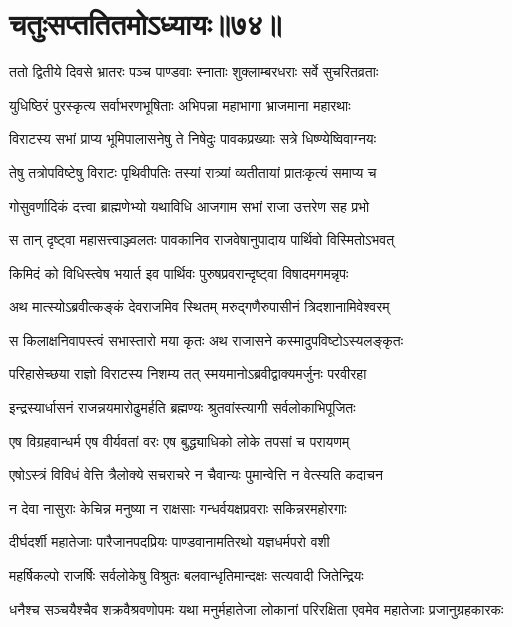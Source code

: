 \chapter{चतुःसप्ततितमोऽध्यायः॥७४॥}
\twolineshloka
{ततो द्वितीये दिवसे भ्रातरः पञ्च पाण्डवाः}
{स्नाताः शुक्लाम्बरधराः सर्वे सुचरितव्रताः}


\twolineshloka
{युधिष्ठिरं पुरस्कृत्य सर्वाभरणभूषिताः}
{अभिपन्ना महाभागा भ्राजमाना महारथाः}


\twolineshloka
{विराटस्य सभां प्राप्य भूमिपालासनेषु ते}
{निषेदुः पावकप्रख्याः सत्रे धिष्ण्येष्विवाग्नयः}


\twolineshloka
{तेषु तत्रोपविष्टेषु विराटः पृथिवीपतिः}
{तस्यां रात्र्यां व्यतीतायां प्रातःकृत्यं समाप्य च}


\twolineshloka
{गोसुवर्णादिकं दत्त्वा ब्राह्मणेभ्यो यथाविधि}
{आजगाम सभां राजा उत्तरेण सह प्रभो}


\twolineshloka
{स तान् दृष्ट्वा महासत्त्वाञ्ज्वलतः पावकानिव}
{राजवेषानुपादाय पार्थिवो विस्मितोऽभवत्}



\twolineshloka
{किमिदं को विधिस्त्वेष भयार्त इव पार्थिवः}
{पुरुषप्रवरान्दृष्ट्वा विषादमगमन्नृपः}


\twolineshloka
{अथ मात्स्योऽब्रवीत्कङ्कं देवराजमिव स्थितम्}
{मरुद्गणैरुपासीनं त्रिदशानामिवेश्वरम्}


\twolineshloka
{स किलाक्षनिवापस्त्वं सभास्तारो मया कृतः}
{अथ राजासने कस्मादुपविष्टोऽस्यलङ्कृतः}



\twolineshloka
{परिहासेच्छया राज्ञो विराटस्य निशम्य तत्}
{स्मयमानोऽब्रवीद्वाक्यमर्जुनः परवीरहा}


\twolineshloka
{इन्द्रस्यार्धासनं राजन्नयमारोढुमर्हति}
{ब्रह्मण्यः श्रुतवांस्त्यागी सर्वलोकाभिपूजितः}


\twolineshloka
{एष विग्रहवान्धर्म एष वीर्यवतां वरः}
{एष बुद्ध्याधिको लोके तपसां च परायणम्}


\twolineshloka
{एषोऽस्त्रं विविधं वेत्ति त्रैलोक्ये सचराचरे}
{न चैवान्यः पुमान्वेत्ति न वेत्स्यति कदाचन}


\twolineshloka
{न देवा नासुराः केचिन्न मनुष्या न राक्षसाः}
{गन्धर्वयक्षप्रवराः सकिन्नरमहोरगाः}


\twolineshloka
{दीर्घदर्शी महातेजाः पारैजानपदप्रियः}
{पाण्डवानामतिरथो यज्ञधर्मपरो वशी}


\twolineshloka
{महर्षिकल्पो राजर्षिः सर्वलोकेषु विश्रुतः}
{बलवान्धृतिमान्दक्षः सत्यवादी जितेन्द्रियः}


\threelineshloka
{धनैश्च सञ्चयैश्चैव शक्रवैश्रवणोपमः}
{यथा मनुर्महातेजा लोकानां परिरक्षिता}
{एवमेव महातेजाः प्रजानुग्रहकारकः}


